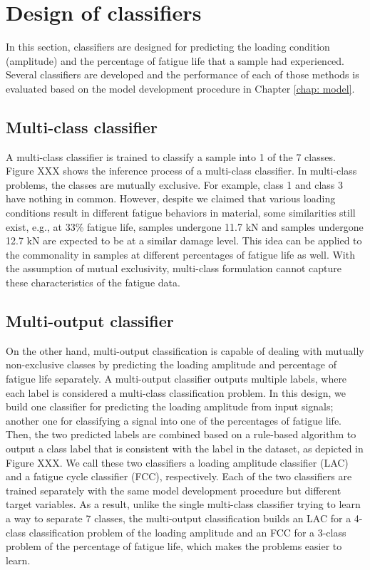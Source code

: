 \section{Design of classifiers}
\label{sec: design of classifiers}
In this section, classifiers are designed for predicting the loading condition (amplitude) and the percentage of fatigue life that a sample had experienced. Several classifiers are developed and the performance of each of those methods is evaluated based on the model development procedure in Chapter \ref{chap: model}.

\subsection{Multi-class classifier}
A multi-class classifier is trained to classify a sample into 1 of the 7 classes. Figure XXX shows the inference process of a multi-class classifier. In multi-class problems, the classes are mutually exclusive. For example, class 1 and class 3 have nothing in common. However, despite we claimed that various loading conditions result in different fatigue behaviors in material, some similarities still exist, e.g., at 33\% fatigue life, samples undergone 11.7 kN and samples undergone 12.7 kN are expected to be at a similar damage level. This idea can be applied to the commonality in samples at different percentages of fatigue life as well. With the assumption of mutual exclusivity, multi-class formulation cannot capture these characteristics of the fatigue data.

\subsection{Multi-output classifier}
\label{subsec: multi-output classifier}
On the other hand, multi-output classification is capable of dealing with mutually non-exclusive classes by predicting the loading amplitude and percentage of fatigue life separately. A multi-output classifier outputs multiple labels, where each label is considered a multi-class classification problem. In this design, we build one classifier for predicting the loading amplitude from input signals; another one for classifying a signal into one of the percentages of fatigue life. Then, the two predicted labels are combined based on a rule-based algorithm to output a class label that is consistent with the label in the dataset, as depicted in Figure XXX. We call these two classifiers a loading amplitude classifier (LAC) and a fatigue cycle classifier (FCC), respectively. Each of the two classifiers are trained separately with the same model development procedure but different target variables. As a result, unlike the single multi-class classifier trying to learn a way to separate 7 classes, the multi-output classification builds an LAC for a 4-class classification problem of the loading amplitude and an FCC for a 3-class problem of the percentage of fatigue life, which makes the problems easier to learn.

